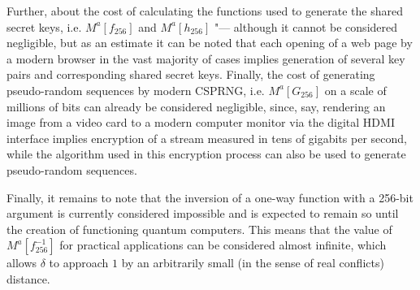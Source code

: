 Further, about the cost of calculating the functions used to generate the shared secret keys, i.e. $M^a[f_{256}]$ and $M^a[h_{256}]$ "--- although it cannot be considered negligible, but as an estimate it can be noted that each opening of a web page by a modern browser in the vast majority of cases implies generation of several key pairs and corresponding shared secret keys. Finally, the cost of generating pseudo-random sequences by modern CSPRNG, i.e. $M^a[G_{256}]$ on a scale of millions of bits can already be considered negligible, since, say, rendering an image from a video card to a modern computer monitor via the digital HDMI interface implies encryption of a stream measured in tens of gigabits per second, while the algorithm used in this encryption process can also be used to generate pseudo-random sequences. %

Finally, it remains to note that the inversion of a one-way function with a 256-bit argument is currently considered impossible and is expected to remain so until the creation of functioning quantum computers. This means that the value of $M^a[f_{256}^{-1}]$ for practical applications can be considered almost infinite, which allows $\delta$ to approach $1$ by an arbitrarily small (in the sense of real conflicts) distance. %

